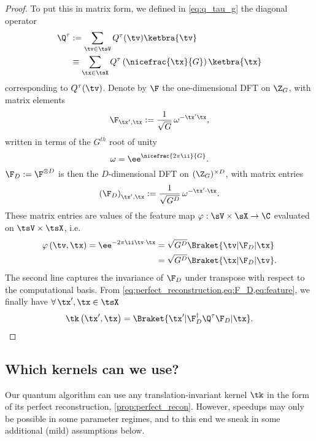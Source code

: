 \begin{proof}
To put this in matrix form, we defined in \cref{eq:q_tau_g} the diagonal operator
\begin{align*}
  \Q^{\tau}&:=\sum_{\tv\in\tsV}Q^{\tau}(\tv)\ketbra{\tv}\nonumber\\
          &\equiv\sum_{\tx\in\tsX}Q^{\tau}\left(\nicefrac{\tx}{G}\right)\ketbra{\tx}
\end{align*}
corresponding to $Q^{\tau}(\tv)$. Denote by $\F$ the one-dimensional DFT on $\Z_{G}$, with matrix elements
\begin{align*}
  \F_{\tx',\tx} := \frac{1}{\sqrt{{G}}}\,\omega^{-\tx'\tx},
\end{align*}
written in terms of the $G^{th}$ root of unity 
\begin{equation*}
  \omega = \ee^{\nicefrac{2\pi\ii}{G}}.
\end{equation*}
$\F_{D} := \F^{\otimes D}$ is then the $D$-dimensional DFT on $(\Z_G)^{\times D}$, with matrix entries
\begin{equation}
  \label{eq:F_D}
  \left(\F_{D}\right)_{\tx',\tx} := \frac{1}{\sqrt{{G^D}}}\,\omega^{-\tx'\cdot\tx}.
\end{equation}
These matrix entries are values of the feature map $\varphi:\sV\times\sX\to\C$ evaluated on $\tsV\times\tsX$, i.e.\
\begin{align}
  \label{eq:feature}
  \varphi\left(\tv,\tx\right) = \ee^{-2\pi\ii \tv\cdot\tx}
                              &=\sqrt{{G}^D}\Braket{\tv|\F_{D}|\tx} \nonumber\\
                              &=\sqrt{{G}^D}\Braket{\tx|\F_{D}|\tv}.
\end{align}
The second line captures the invariance of $\F_{D}$ under transpose with respect to the computational basis.
From \cref{eq:perfect_reconstruction,eq:F_D,eq:feature}, we finally have $\forall\, \tx',\tx\in\tsX$
\begin{equation}
  \label{eq:kernel_decomposition}
  \tk\left(\tx',\tx\right)=\Braket{\tx'|\F_{D}^\dag \Q^{\tau} \F_{D}|\tx}.
\end{equation}
\end{proof}

\subsection*{Which kernels can we use?}
\label{app:which_kernels}

Our quantum algorithm can use any translation-invariant kernel $\tk$ in the form of its perfect reconstruction, \cref{prop:perfect_recon}. However, speedups may only be possible in some parameter regimes, and to this end we sneak in some additional (mild) assumptions below.

